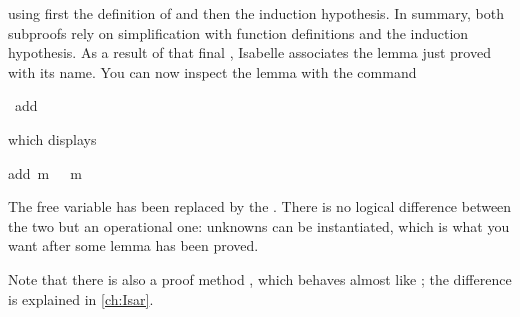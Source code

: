 \begin{isabellebody}
\begin{isamarkuptxt}
using first the definition of  and then the induction hypothesis.
In summary, both subproofs rely on simplification with function definitions and
the induction hypothesis.
As a result of that final , Isabelle associates the lemma
just proved with its name. You can now inspect the lemma with the command%
\end{isamarkuptxt}%
\isamarkuptrue%
%
\endisatagproof
{\isafoldproof}%
%
\isadelimproof
%
\endisadelimproof
{}\isamarkupfalse%
\ add{}{}{}%
\isadelimproof
%
\endisadelimproof
%
\isatagproof
%
\begin{isamarkuptxt}%
which displays \begin{isabelle}%
add\ {}m\ {}\ {}\ {}m%
\end{isabelle} The free
variable  has been replaced by the 
. There is no logical difference between the two but an
operational one: unknowns can be instantiated, which is what you want after
some lemma has been proved.

Note that there is also a proof method , which behaves almost
like ; the difference is explained in \autoref{ch:Isar}.


\end{isamarkuptxt}
\end{isabellebody}
